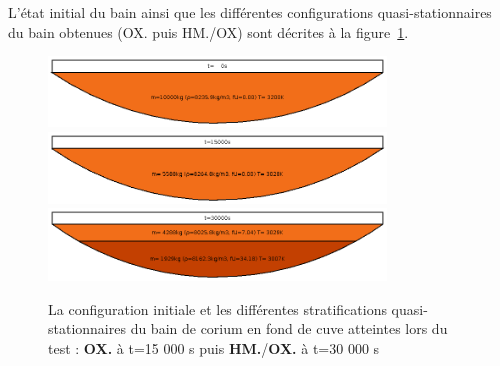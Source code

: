 L'état initial du bain ainsi que les différentes configurations quasi-stationnaires du bain obtenues (OX. puis HM./OX) sont décrites à la figure~\ref{fig:stratification_bains}.
\begin{figure}
\centering
\includegraphics[width=0.8\textwidth, keepaspectratio=true]{Figures/coriumPool_t=00000.png}\\
\includegraphics[width=0.8\textwidth, keepaspectratio=true]{Figures/coriumPool_t=15000.png}\\
\includegraphics[width=0.8\textwidth, keepaspectratio=true]{Figures/coriumPool_t=30000.png}
\caption{La configuration initiale et les différentes stratifications quasi-stationnaires du bain de corium en fond de cuve atteintes lors du test : \textcolor{orange!75!black}{\textbf{OX.}} à t=15 000 s puis \textcolor{red!50!black}{\textbf{HM.}}/\textcolor{orange!75!black}{\textbf{OX.}} à t=30 000 s}
\label{fig:stratification_bains}
\end{figure}


